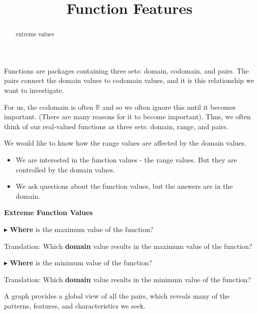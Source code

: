 \documentclass{ximera}
\title{Function Features}
\begin{document}
\begin{abstract}
extreme values
\end{abstract}
\maketitle





Functions are packages containing three sets: domain, codomain, and pairs.  The pairs connect the domain values to codomain values, and it is this relationship we want to investigate.   


For us, the codomain is often $\mathbb{R}$ and so we often ignore this until it becomes important.  (There are many reasons for it to become important).  Thus, we often think of our real-valued functions as three sets: domain, range, and pairs. 


We would like to know how the range values are affected by the domain values. 


\begin{itemize}
\item We are interested in the function values - the range values.  But they are controlled by the domain values. 
\item We ask questions about the function values, but the answers are in the domain.
\end{itemize}




\begin{idea} \textbf{\textcolor{blue!55!black}{Extreme Function Values}} 


$\blacktriangleright$ \textbf{\textcolor{purple!85!blue}{Where}} is the maximum value of the function? 

Translation: Which \textbf{\textcolor{purple!85!blue}{domain}} value results in the maximum value of the function? 


$\blacktriangleright$ \textbf{\textcolor{purple!85!blue}{Where}} is the minimum value of the function? 

Translation: Which \textbf{\textcolor{purple!85!blue}{domain}} value results in the minimum value of the function? 


\end{idea}








A graph provides a global view of all the pairs, which reveals many of the patterns, features, and characteristics we seek.   
\end{document}

